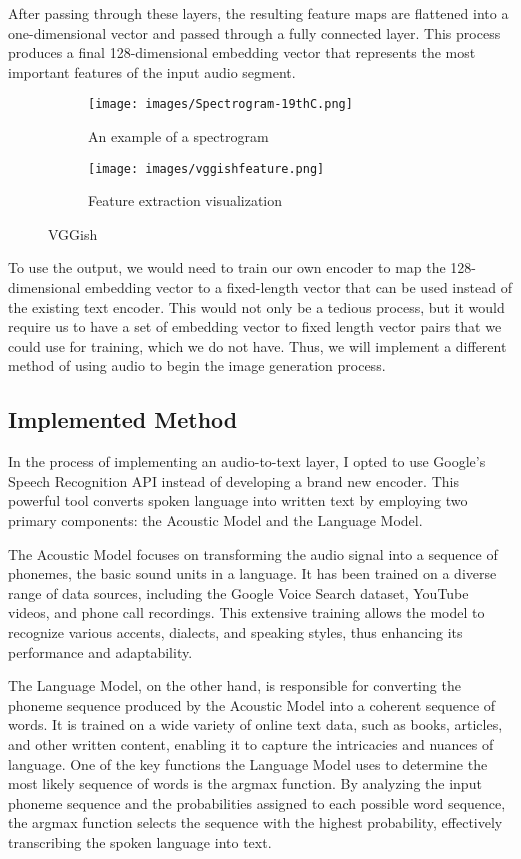 \documentclass{article}
\begin{document}
After passing through these layers, the resulting feature maps are flattened into a one-dimensional vector and passed through a fully connected layer. This process produces a final 128-dimensional embedding vector that represents the most important features of the input audio segment.


\begin{figure}
\centering
\begin{subfigure}{.5\textwidth}
  \centering
  \texttt{[image: images/Spectrogram-19thC.png]}
  \caption{An example of a spectrogram}
  \label{fig:sub1}
\end{subfigure}%
\begin{subfigure}{.5\textwidth}
  \centering
  \texttt{[image: images/vggishfeature.png]}
  \caption{Feature extraction visualization}
  \label{fig:sub2}
\end{subfigure}
\caption{VGGish}
\label{fig:test}
\end{figure}

To use the output, we would need to train our own encoder to map the 128-dimensional embedding vector to a fixed-length vector that can be used instead of the existing text encoder. This would not only be a tedious process, but it would require us to have a set of embedding vector to fixed length vector pairs that we could use for training, which we do not have. Thus, we will implement a different method of using audio to begin the image generation process.

\subsection{Implemented Method}

In the process of implementing an audio-to-text layer, I opted to use Google's Speech Recognition API instead of developing a brand new encoder. This powerful tool converts spoken language into written text by employing two primary components: the Acoustic Model and the Language Model.

The Acoustic Model focuses on transforming the audio signal into a sequence of phonemes, the basic sound units in a language. It has been trained on a diverse range of data sources, including the Google Voice Search dataset, YouTube videos, and phone call recordings. This extensive training allows the model to recognize various accents, dialects, and speaking styles, thus enhancing its performance and adaptability.

The Language Model, on the other hand, is responsible for converting the phoneme sequence produced by the Acoustic Model into a coherent sequence of words. It is trained on a wide variety of online text data, such as books, articles, and other written content, enabling it to capture the intricacies and nuances of language. One of the key functions the Language Model uses to determine the most likely sequence of words is the argmax function. By analyzing the input phoneme sequence and the probabilities assigned to each possible word sequence, the argmax function selects the sequence with the highest probability, effectively transcribing the spoken language into text.
\end{document}
